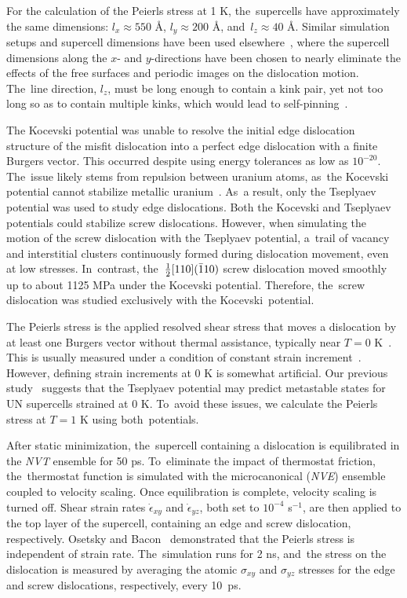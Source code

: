\documentclass[applsci,article,accept,pdftex,moreauthors]{Definitions/mdpi}
\newcommand{\?}{\stackrel{?}{=}}
\begin{document}
For the calculation of the Peierls stress at 1 K, the~supercells have approximately the same dimensions: $l_x \approx 550$ \AA, $l_y \approx 200$ \AA, and~$l_z \approx 40$ \AA. Similar simulation setups and supercell dimensions have been used elsewhere~\cite{Osetsky2003, Olmsted2005, Cho2017, Dang2019, Kaloni2023}, where the supercell dimensions along the $x$- and $y$-directions have been chosen to nearly eliminate the effects of the free surfaces and periodic images on the dislocation motion. The~line direction, $l_z$, must be long enough to contain a kink pair, yet not too long so as to contain multiple kinks, which would lead to self-pinning~\cite{Gilbert2011}.

The Kocevski potential was unable to resolve the initial edge dislocation structure of the misfit dislocation into a perfect edge dislocation with a finite Burgers vector. This occurred despite using energy tolerances as low as $10^{-20}$. The~issue likely stems from repulsion between uranium atoms, as~the Kocevski potential cannot stabilize metallic uranium~\cite{AbdulHameed2024}. As~a result, only the Tseplyaev potential was used to study edge dislocations. Both the Kocevski and Tseplyaev potentials could stabilize screw dislocations. However, when simulating the motion of the screw dislocation with the Tseplyaev potential, a~trail of vacancy and interstitial clusters continuously formed during dislocation movement, even at low stresses. In~contrast, the~$\frac{1}{2} [110] ( \Bar{1} 1 0 )$ screw dislocation moved smoothly up to about 1125 MPa under the Kocevski potential. Therefore, the~screw dislocation was studied exclusively with the Kocevski~potential.

The Peierls stress is the applied resolved shear stress that moves a dislocation by at least one Burgers vector without thermal assistance, typically near $T = 0$ K~\cite{Hull2011}. This is usually measured under a condition of constant strain increment~\cite{Puls1976, Osetsky2003}. However, defining strain increments at 0 K is somewhat artificial. Our previous study~\cite{AbdulHameed2024} suggests that the Tseplyaev potential may predict metastable states for UN supercells strained at 0 K. To~avoid these issues, we calculate the Peierls stress at $T = 1$ K using both~potentials.

After static minimization, the~supercell containing a dislocation is equilibrated in the \textit{NVT} ensemble for 50 ps. To~eliminate the impact of thermostat friction, the~thermostat function is simulated with the microcanonical (\textit{NVE}) ensemble coupled to velocity scaling. Once equilibration is complete, velocity scaling is turned off. Shear strain rates $\Dot{\epsilon}_{xy}$ and $\Dot{\epsilon}_{yz}$, both set to $10^{-4}$ s$^{-1}$, are then applied to the top layer of the supercell, containing an edge and screw dislocation, respectively. Osetsky and Bacon~\cite{Osetsky2003} demonstrated that the Peierls stress is independent of strain rate. The~simulation runs for 2 ns, and~the stress on the dislocation is measured by averaging the atomic $\sigma_{xy}$ and $\sigma_{yz}$ stresses for the edge and screw dislocations, respectively, every 10~ps.
\end{document}
